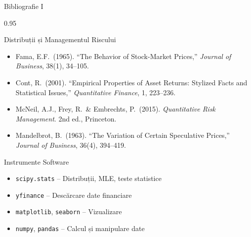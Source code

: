 \documentclass[9pt, aspectratio=169, t]{beamer}
\begin{document}
\begin{frame}{Bibliografie I}
    \begin{cminipage}{0.95\textwidth}
    \begin{block}{Distribuții și Managementul Riscului}
        {\small
        \begin{itemize}\setlength{\itemsep}{0pt}
            \item Fama, E.F.\ (1965). ``The Behavior of Stock-Market Prices,'' \textit{Journal of Business}, 38(1), 34--105.
            \item Cont, R.\ (2001). ``Empirical Properties of Asset Returns: Stylized Facts and Statistical Issues,'' \textit{Quantitative Finance}, 1, 223--236.
            \item McNeil, A.J., Frey, R.\ \& Embrechts, P.\ (2015). \textit{Quantitative Risk Management}. 2nd ed., Princeton.
            \item Mandelbrot, B.\ (1963). ``The Variation of Certain Speculative Prices,'' \textit{Journal of Business}, 36(4), 394--419.
        \end{itemize}
        }
    \end{block}
    \begin{exampleblock}{Instrumente Software}
        {\small
        \begin{itemize}\setlength{\itemsep}{0pt}
            \item \texttt{scipy.stats} -- Distribuții, MLE, teste statistice
            \item \texttt{yfinance} -- Descărcare date financiare
            \item \texttt{matplotlib}, \texttt{seaborn} -- Vizualizare
            \item \texttt{numpy}, \texttt{pandas} -- Calcul și manipulare date
        \end{itemize}
        }
    \end{exampleblock}
    \end{cminipage}
\end{frame}
\end{document}
